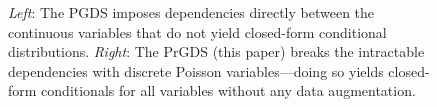 \documentclass{article}
\begin{document}
\begin{figure}[t]
\centering
{}\hfill
% 
\caption{\label{fig:comparison} \footnotesize \emph{Left}: The PGDS imposes dependencies directly between the continuous variables that do not yield closed-form conditional distributions. \emph{Right}: The PrGDS (this paper) breaks the intractable dependencies with discrete Poisson variables---doing so yields closed-form conditionals for all variables without any data augmentation.~}\vspace{-1.5em}
\end{figure}
\end{document}
